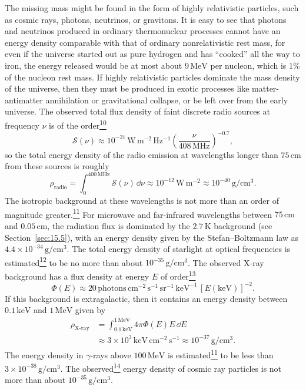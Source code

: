 The missing mass might be found in the form of highly relativistic particles,
such as cosmic rays, photons, neutrinos, or gravitons. It is easy to see that
photons and neutrinos produced in ordinary thermonuclear processes cannot have
an energy density comparable with that of ordinary nonrelativistic rest mass,
for even if the universe started out as pure hydrogen and has ``cooked'' all the
way to iron, the energy released would be at most about \(9\,\mathrm{MeV}\)
per nucleon, which is 1\% of the nucleon rest mass. If highly relativistic
particles dominate the mass density of the universe, then they must be produced
in exotic processes like matter-antimatter annihilation or gravitational
collapse, or be left over from the early universe. The observed total flux
density of faint discrete radio sources at frequency \(\nu\) is of the
order\hyperref[ch15-ref-10]{\textsuperscript{10}}
\[
  \mathscr S(\nu)
  \approx
  10^{-21}\,\mathrm{W\,m^{-2}\,Hz^{-1}}
  \left(\frac{\nu}{408\,\mathrm{MHz}}\right)^{-0.7},
\]
so the total energy density of the radio emission at wavelengths longer than
\(75\,\mathrm{cm}\) from these sources is roughly
\[
  \rho_{\mathrm{radio}}
  =
  \int_0^{400\,\mathrm{MHz}}\mathscr S(\nu)\,\dd\nu
  \approx10^{-12}\,\mathrm{W\,m^{-2}}
  \approx10^{-40}\,\mathrm{g/cm^3}.
\]
The isotropic background at these wavelengths is not more than an order of
magnitude greater.\hyperref[ch15-ref-11]{\textsuperscript{11}} For microwave
and far-infrared wavelengths between \(75\,\mathrm{cm}\) and
\(0.05\,\mathrm{cm}\), the radiation flux is dominated by the
\(2.7\,\mathrm{K}\) background (see Section~\ref{sec:15.5}), with an energy
density given by the Stefan--Boltzmann law as
\(4.4\times10^{-34}\,\mathrm{g/cm^3}\). The total energy density of
starlight at optical frequencies is
estimated\hyperref[ch15-ref-12]{\textsuperscript{12}} to be no more than
about \(10^{-35}\,\mathrm{g/cm^3}\). The observed X-ray background has a
flux density at energy \(E\) of
order\hyperref[ch15-ref-13]{\textsuperscript{13}}
\[
  \Phi(E)
  \approx
  20\,\mathrm{photons\,cm^{-2}\,s^{-1}\,sr^{-1}\,keV^{-1}}\,
  [E(\mathrm{keV})]^{-2}.
\]
If this background is extragalactic, then it contains an energy density
between \(0.1\,\mathrm{keV}\) and \(1\,\mathrm{MeV}\) given by
\begin{align*}
  \rho_{\mathrm{X\text{-}ray}}
  &=
  \int_{0.1\,\mathrm{keV}}^{1\,\mathrm{MeV}}
  4\pi\Phi(E)E\,\dd E\\
  &\approx
  3\times10^3\,\mathrm{keV\,cm^{-2}\,s^{-1}}
  \approx10^{-37}\,\mathrm{g/cm^3}.
\end{align*}
The energy density in \(\gamma\)-rays above \(100\,\mathrm{MeV}\) is
estimated\hyperref[ch15-ref-11]{\textsuperscript{11}} to be less than
\(3\times10^{-38}\,\mathrm{g/cm^3}\). The
observed\hyperref[ch15-ref-14]{\textsuperscript{14}} energy density of cosmic
ray particles is not more than about \(10^{-35}\,\mathrm{g/cm^3}\).

